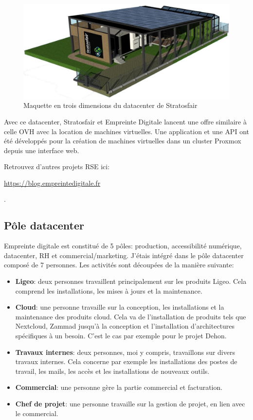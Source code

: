 \documentclass[12pt, a4paper, twoside]{article}
\begin{document}
\begin{figure}[!ht]
    \centering
    \includegraphics[width=\textwidth]{src/scheme_strato.jpg}
    \caption{Maquette en trois dimensions du datacenter de Stratosfair}
    \label{fig:strato}
\end{figure}

Avec ce datacenter, Stratosfair et Empreinte Digitale lancent une offre similaire à celle OVH avec la location de machines virtuelles.
Une application et une \gls{API} ont été développés pour la création de machines virtuelles dans un \gls{cluster} \gls{Proxmox} depuis une interface web.

Retrouvez d'autres projets \gls{RSE} ici: \begin{hilite}\url{https://blog.empreintedigitale.fr}\end{hilite}.

\subsection{Pôle datacenter}
Empreinte digitale est constitué de 5 pôles: production, accessibilité numérique, datacenter, RH et commercial/marketing.
J'étais intégré dans le pôle datacenter composé de 7 personnes. 
\noindent%
Les activités sont découpées de la manière suivante:
\begin{itemize}
    \item \textbf{Ligeo}: deux personnes travaillent principalement sur les produits Ligeo. 
    Cela comprend les installations, les mises à jours et la maintenance.
    \item \textbf{Cloud}: une personne travaille sur la conception, les installations et la maintenance des produits cloud. 
    Cela va de l'installation de produits tels que \gls{Nextcloud}, Zammad jusqu'à la conception et l'installation d'architectures spécifiques à un besoin. 
    C'est le cas par exemple pour le projet Dehon.
    \item \textbf{Travaux internes}: deux personnes, moi y compris, travaillons sur divers travaux internes. 
    Cela concerne par exemple les installations des postes de travail, les mails, les accès et les installations de nouveaux outils.
    \item \textbf{Commercial}: une personne gère la partie commercial et facturation.
    \item \textbf{Chef de projet}: une personne travaille sur la gestion de projet, en lien avec le commercial.
\end{itemize}
\end{document}
